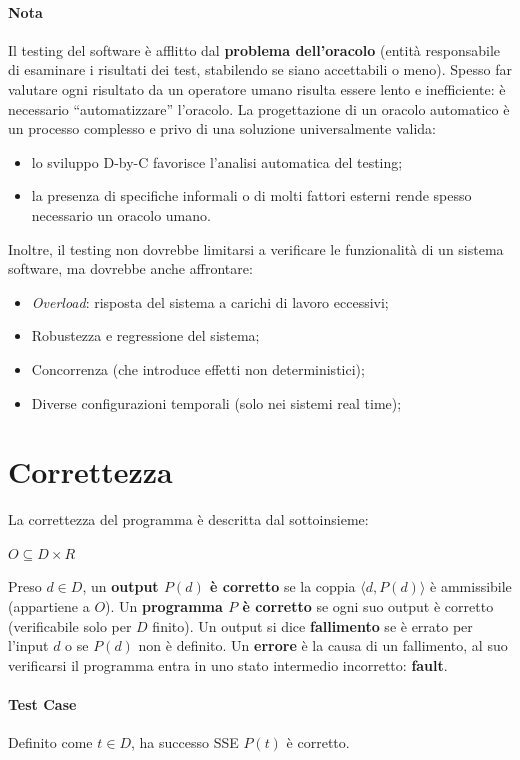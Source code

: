 \paragraph{Nota} Il testing del software è afflitto dal \textbf{problema dell'oracolo} (entità responsabile di esaminare i risultati dei test, stabilendo se siano accettabili o meno). Spesso far valutare ogni risultato da un operatore umano risulta essere lento e inefficiente: è necessario “automatizzare” l'oracolo. La progettazione di un oracolo automatico è un processo complesso e privo di una soluzione universalmente valida:
\begin{itemize}
    \item lo sviluppo D-by-C favorisce l'analisi automatica del testing; 
    \item la presenza di specifiche informali o di molti fattori esterni rende spesso necessario un oracolo umano.
\end{itemize}
Inoltre, il testing non dovrebbe limitarsi a verificare le funzionalità di un sistema software, ma dovrebbe anche affrontare:
\begin{itemize}
\item \textit{Overload}: risposta del sistema a carichi di lavoro eccessivi;
\item Robustezza e regressione del sistema;
\item Concorrenza (che introduce effetti non deterministici);
\item Diverse configurazioni temporali (solo nei sistemi real time);
\end{itemize}

\section{Correttezza}

La correttezza del programma è descritta dal sottoinsieme:
\begin{center}
$O \subseteq D \times R$    
\end{center}
Preso $d \in D$, un \textbf{output $P(d)$ è corretto} se la coppia $\langle d, P(d) \rangle$ è ammissibile (appartiene a $O$). Un \textbf{programma $P$ è corretto} se ogni suo output è corretto (verificabile solo per $D$ finito). Un output si dice \textbf{fallimento} se è errato per l'input $d$ o se $P(d)$ non è definito. Un \textbf{errore} è la causa di un fallimento, al suo verificarsi il programma entra in uno stato intermedio incorretto: \textbf{fault}.

\paragraph{Test Case} Definito come $t \in D$, ha successo SSE $P(t)$ è corretto.

